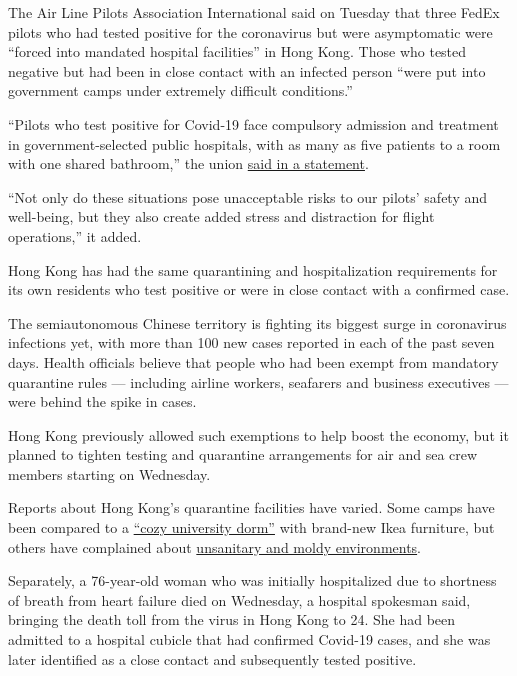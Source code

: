 The Air Line Pilots Association International said on Tuesday that three
FedEx pilots who had tested positive for the coronavirus but were
asymptomatic were ``forced into mandated hospital facilities'' in Hong
Kong. Those who tested negative but had been in close contact with an
infected person ``were put into government camps under extremely
difficult conditions.''

``Pilots who test positive for Covid-19 face compulsory admission and
treatment in government-selected public hospitals, with as many as five
patients to a room with one shared bathroom,'' the union
\href{https://www.alpa.org/news-and-events/news-room/2020-07-28-fedex-pilots-face-unacceptable-conditions-in-hong-kong}{said
in a statement}.

``Not only do these situations pose unacceptable risks to our pilots'
safety and well-being, but they also create added stress and distraction
for flight operations,'' it added.

Hong Kong has had the same quarantining and hospitalization requirements
for its own residents who test positive or were in close contact with a
confirmed case.

The semiautonomous Chinese territory is fighting its biggest surge in
coronavirus infections yet, with more than 100 new cases reported in
each of the past seven days. Health officials believe that people who
had been exempt from mandatory quarantine rules --- including airline
workers, seafarers and business executives --- were behind the spike in
cases.

Hong Kong previously allowed such exemptions to help boost the economy,
but it planned to tighten testing and quarantine arrangements for air
and sea crew members starting on Wednesday.

Reports about Hong Kong's quarantine facilities have varied. Some camps
have been compared to a
\href{https://edition.cnn.com/2020/04/09/homepage2/hong-kong-coronavirus-quarantine-diary-intl-hnk/index.html}{``cozy
university dorm''} with brand-new Ikea furniture, but others have
complained about
\href{https://hongkongfp.com/2020/04/18/coronavirus-hong-kong-quarantine-arrivals-complain-of-disorderly-unsanitary-govt-facilities/}{unsanitary
and moldy environments}.

Separately, a 76-year-old woman who was initially hospitalized due to
shortness of breath from heart failure died on Wednesday, a hospital
spokesman said, bringing the death toll from the virus in Hong Kong to
24. She had been admitted to a hospital cubicle that had confirmed
Covid-19 cases, and she was later identified as a close contact and
subsequently tested positive.

